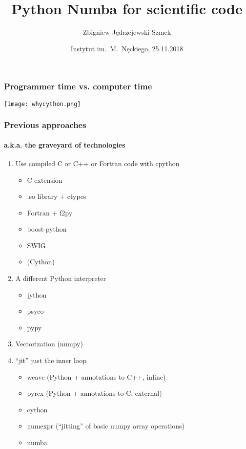 \documentclass[serif]{beamer}
\title{Python Numba for scientific code}
\author{Zbigniew Jędrzejewski-Szmek}
\institute{%
  \medskip
  \textit{zbyszek@in.waw.pl}\\
  \medskip
  \ccbysa
}
\date{\tiny Instytut im.\ M.\ Nęckiego, 25.11.2018}
\begin{document}
\begin{frame}
\titlepage %
\end{frame}

\begin{frame}
  \frametitle{Programmer time vs. computer time}
  \texttt{[image: whycython.png]}
\end{frame}

\begin{frame}
  \frametitle{Previous approaches}
  \framesubtitle{a.k.a. the graveyard of technologies}

  \begin{enumerate}
  \item Use compiled C or C++ or Fortran code with cpython
    \begin{itemize}
    \item C extension
    \item .so library + ctypes
    \item Fortran + f2py
    \item boost-python
    \item SWIG
    \item (Cython)
    \end{itemize}
    \pause
  \item A different Python interpreter
    \begin{itemize}
    \item jython
    \item psyco
    \item pypy
    \end{itemize}
    \pause

  \item Vectorization (numpy)
    \pause

  \item ``jit'' just the inner loop
    \begin{itemize}
    \item weave (Python + annotations to C++, inline)
    \item pyrex (Python + annotations to C, external)
    \item cython
    \item numexpr (``jitting'' of basic numpy array operations)
    \item numba
    \end{itemize}

  \end{enumerate}
\end{frame}
\end{document}
